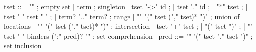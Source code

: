 \begin{syntax}
  tset ::= "\empty" ; empty set 
       | term ; singleton
       | tset "->" id ;
       | tset "." id  ;
       | "*" tset ;
       | tset "[" tset "]" ;
       | term? ".." term? ; range
       | "\union" "(" tset ("," tset)* ")" ; union of locations
       | "\inter" "(" tset ("," tset)* ")" ; intersection
       | tset "+" tset ;
       | "(" tset ")" ;
       | "{" tset "|" binders (";" pred)? "}" ; set comprehension
       \
  pred ::= "\subset" "(" tset "," tset ")" ; set inclusion
\end{syntax}

